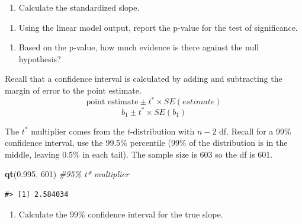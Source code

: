 \documentclass[
]{report}
\newenvironment{Shaded}{\begin{snugshade}}{\end{snugshade}}
\newcommand{\CommentTok}[1]{\textcolor[rgb]{0.56,0.35,0.01}{\textit{#1}}}
\newcommand{\DecValTok}[1]{\textcolor[rgb]{0.00,0.00,0.81}{#1}}
\newcommand{\FloatTok}[1]{\textcolor[rgb]{0.00,0.00,0.81}{#1}}
\newcommand{\FunctionTok}[1]{\textcolor[rgb]{0.13,0.29,0.53}{\textbf{#1}}}
\newcommand{\NormalTok}[1]{#1}
\providecommand{\tightlist}{%
  \setlength{\itemsep}{0pt}\setlength{\parskip}{0pt}}
\begin{document}
\begin{enumerate}
\def\labelenumi{\arabic{enumi}.}
\setcounter{enumi}{11}
\tightlist
\item
  Calculate the standardized slope.
\end{enumerate}

\vspace{1in}

\begin{enumerate}
\def\labelenumi{\arabic{enumi}.}
\setcounter{enumi}{12}
\tightlist
\item
  Using the linear model output, report the p-value for the test of significance.
\end{enumerate}

\vspace{0.5in}

\begin{enumerate}
\def\labelenumi{\arabic{enumi}.}
\setcounter{enumi}{13}
\tightlist
\item
  Based on the p-value, how much evidence is there against the null hypothesis?
\end{enumerate}

\vspace{0.5in}

Recall that a confidence interval is calculated by adding and subtracting the margin of error to the point estimate.\\
\[\mbox{point estimate}\pm t^* \times SE(estimate)\]
\[b_1 \pm t^* \times SE(b_1)\]

The \(t^*\) multiplier comes from the \(t\)-distribution with \(n-2\) df. Recall for a 99\% confidence interval, use the 99.5\% percentile (99\% of the distribution is in the middle, leaving 0.5\% in each tail). The sample size is 603 so the df is 601.

\begin{Shaded}
\begin{Highlighting}[]
\FunctionTok{qt}\NormalTok{(}\FloatTok{0.995}\NormalTok{, }\DecValTok{601}\NormalTok{) }\CommentTok{\#95\% t* multiplier }
\end{Highlighting}
\end{Shaded}

\begin{verbatim}
#> [1] 2.584034
\end{verbatim}

\begin{enumerate}
\def\labelenumi{\arabic{enumi}.}
\setcounter{enumi}{14}
\tightlist
\item
  Calculate the 99\% confidence interval for the true slope.
  \vspace{1in}
\end{enumerate}
\end{document}
